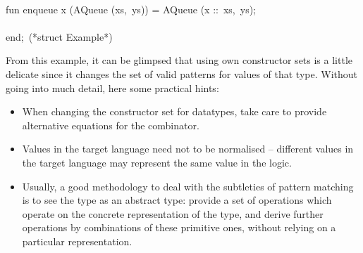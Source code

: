 \begin{isabellebody}
\begin{isamarkuptext}
\hspace*{0pt}\\
\hspace*{0pt}fun enqueue x (AQueue (xs,~ys)) = AQueue (x ::~xs,~ys);\\
\hspace*{0pt}\\
\hspace*{0pt}end;~(*struct Example*)%
\end{isamarkuptext}%
\isamarkuptrue%
%
\endisatagquote
{\isafoldquote}%
%
\isadelimquote
%
\endisadelimquote
%
\begin{isamarkuptext}%
\noindent From this example, it can be glimpsed that using own
  constructor sets is a little delicate since it changes the set of
  valid patterns for values of that type.  Without going into much
  detail, here some practical hints:

  \begin{itemize}

    \item When changing the constructor set for datatypes, take care
      to provide alternative equations for the  combinator.

    \item Values in the target language need not to be normalised --
      different values in the target language may represent the same
      value in the logic.

    \item Usually, a good methodology to deal with the subtleties of
      pattern matching is to see the type as an abstract type: provide
      a set of operations which operate on the concrete representation
      of the type, and derive further operations by combinations of
      these primitive ones, without relying on a particular
      representation.


\end{itemize}
\end{isamarkuptext}
\end{isabellebody}
